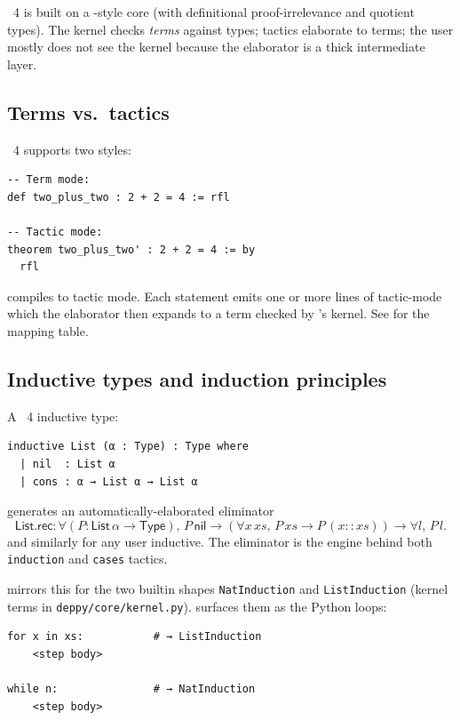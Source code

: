 \Lean{}~4 is built on a \CIC-style core (with definitional
proof-irrelevance and quotient types).  The kernel checks
\emph{terms} against types; tactics elaborate to terms; the user
mostly does not see the kernel because the elaborator is a thick
intermediate layer.

\subsection{Terms vs.\ tactics}

\Lean{}~4 supports two styles:

\begin{lstlisting}[language=lean4,caption={Term-mode and
tactic-mode proofs in \Lean{}~4 are interchangeable.}]
-- Term mode:
def two_plus_two : 2 + 2 = 4 := rfl

-- Tactic mode:
theorem two_plus_two' : 2 + 2 = 4 := by
  rfl
\end{lstlisting}

\PSDL{} compiles to tactic mode.  Each \PSDL{} statement emits one or
more lines of tactic-mode \Lean{} which the elaborator then expands
to a term checked by \Lean's kernel.  See  for the
mapping table.

\subsection{Inductive types and induction principles}

A \Lean{}~4 inductive type:

\begin{lstlisting}[language=lean4]
inductive List (α : Type) : Type where
  | nil  : List α
  | cons : α → List α → List α
\end{lstlisting}

generates an automatically-elaborated eliminator
\begin{equation*}
  \mathsf{List.rec} : \forall (P : \mathsf{List}\,\alpha \to \mathsf{Type}),\,
    P\,\mathsf{nil} \to (\forall x\,xs,\, P\,xs \to P\,(x :: xs))
    \to \forall l,\, P\,l.
\end{equation*}
and similarly for any user inductive.  The eliminator is the engine
behind both \texttt{induction} and \texttt{cases} tactics.

\Deppy{} mirrors this for the two builtin shapes \verb|NatInduction|
and \verb|ListInduction| (kernel terms in
\verb|deppy/core/kernel.py|).  \PSDL{} surfaces them as the Python
loops:

\begin{lstlisting}[language=psdl]
for x in xs:           # → ListInduction
    <step body>

while n:               # → NatInduction
    <step body>
\end{lstlisting}

